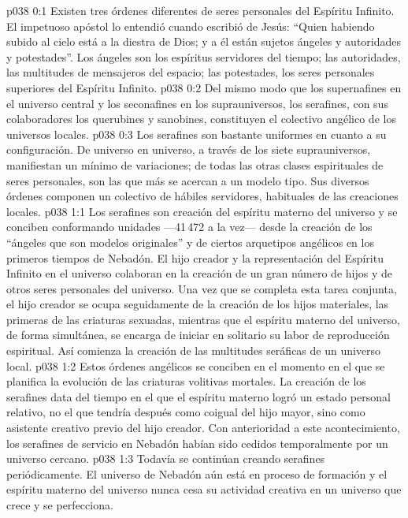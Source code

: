 \author{Melquisedec}
\vs p038 0:1 Existen tres órdenes diferentes de seres personales del Espíritu Infinito. El impetuoso apóstol lo entendió cuando escribió de Jesús: “Quien habiendo subido al cielo está a la diestra de Dios; y a él están sujetos ángeles y autoridades y potestades”. Los ángeles son los espíritus servidores del tiempo; las autoridades, las multitudes de mensajeros del espacio; las potestades, los seres personales superiores del Espíritu Infinito.
\vs p038 0:2 \pc Del mismo modo que los supernafines en el universo central y los seconafines en los suprauniversos, los serafines, con sus colaboradores los querubines y sanobines, constituyen el colectivo angélico de los universos locales.
\vs p038 0:3 Los serafines son bastante uniformes en cuanto a su configuración. De universo en universo, a través de los siete suprauniversos, manifiestan un mínimo de variaciones; de todas las otras clases espirituales de seres personales, son las que más se acercan a un modelo tipo. Sus diversos órdenes componen un colectivo de hábiles servidores, habituales de las creaciones locales.
\vs p038 1:1 Los serafines son creación del espíritu materno del universo y se conciben conformando unidades ---41\,472 a la vez--- desde la creación de los “ángeles que son modelos originales” y de ciertos arquetipos angélicos en los primeros tiempos de Nebadón. El hijo creador y la representación del Espíritu Infinito en el universo colaboran en la creación de un gran número de hijos y de otros seres personales del universo. Una vez que se completa esta tarea conjunta, el hijo creador se ocupa seguidamente de la creación de los hijos materiales, las primeras de las criaturas sexuadas, mientras que el espíritu materno del universo, de forma simultánea, se encarga de iniciar en solitario su labor de reproducción espiritual. Así comienza la creación de las multitudes seráficas de un universo local.
\vs p038 1:2 Estos órdenes angélicos se conciben en el momento en el que se planifica la evolución de las criaturas volitivas mortales. La creación de los serafines data del tiempo en el que el espíritu materno logró un estado personal relativo, no el que tendría después como coigual del hijo mayor, sino como asistente creativo previo del hijo creador. Con anterioridad a este acontecimiento, los serafines de servicio en Nebadón habían sido cedidos temporalmente por un universo cercano.
\vs p038 1:3 Todavía se continúan creando serafines periódicamente. El universo de Nebadón aún está en proceso de formación y el espíritu materno del universo nunca cesa su actividad creativa en un universo que crece y se perfecciona.

